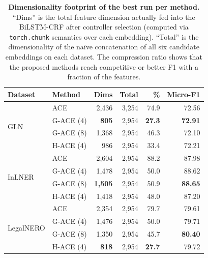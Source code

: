 \begin{table}[t]
\centering
\setlength{\tabcolsep}{4pt}
\renewcommand{\arraystretch}{1.05}
\caption{\textbf{Dimensionality footprint of the best run per method.}
``Dims'' is the total feature dimension actually fed into the BiLSTM-CRF after
controller selection (computed via \texttt{torch.chunk} semantics over each
embedding). ``Total'' is the dimensionality of the naïve concatenation of all
six candidate embeddings on each dataset. The compression ratio shows that the
proposed methods reach competitive or better F1 with a fraction of the
features.}
\label{tab:dim_footprint}
\footnotesize
\begin{tabular}{llrrrr}
\toprule
\textbf{Dataset} & \textbf{Method} & \textbf{Dims} & \textbf{Total} & \textbf{\%} & \textbf{Micro-F1} \\
\midrule
\multirow{4}{*}{GLN}
 & ACE        & 2{,}436 & 3{,}254 & 74.9 & 72.56 \\
 & G-ACE (4)  & \textbf{805}   & 2{,}954 & \textbf{27.3} & \textbf{72.91} \\
 & G-ACE (8)  & 1{,}368 & 2{,}954 & 46.3 & 72.10 \\
 & H-ACE (4)  & 986   & 2{,}954 & 33.4 & 72.21 \\
\midrule
\multirow{4}{*}{InLNER}
 & ACE        & 2{,}604 & 2{,}954 & 88.2 & 87.98 \\
 & G-ACE (4)  & 1{,}478 & 2{,}954 & 50.0 & 88.62 \\
 & G-ACE (8)  & \textbf{1{,}505} & 2{,}954 & 50.9 & \textbf{88.65} \\
 & H-ACE (4)  & 1{,}418 & 2{,}954 & 48.0 & 87.20 \\
\midrule
\multirow{4}{*}{LegalNERO}
 & ACE        & 2{,}354 & 2{,}954 & 79.7 & 79.61 \\
 & G-ACE (4)  & 1{,}476 & 2{,}954 & 50.0 & 79.71 \\
 & G-ACE (8)  & 1{,}350 & 2{,}954 & 45.7 & \textbf{80.40} \\
 & H-ACE (4)  & \textbf{818}   & 2{,}954 & \textbf{27.7} & 79.72 \\
\bottomrule
\end{tabular}
\end{table}
